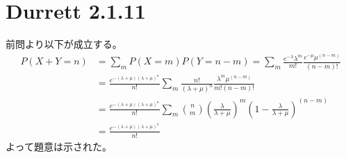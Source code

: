\documentclass{article}
\begin{document}
\section{Durrett 2.1.11}
前問より以下が成立する。
\begin{align*}
	P(X+Y = n) &= \sum_m P(X = m) P(Y = n-m) = \sum_m \frac{e^{-\lambda} \lambda^m}{m!} \frac{e^{-\mu} \mu^{(n-m)}}{(n-m)!}\\[8pt]
	&=\frac{e^{-(\lambda + \mu) (\lambda + \mu)^n}}{n!} \sum_m \frac{n!}{(\lambda + \mu)^n} \frac{\lambda^m \mu^{(n-m)}}{m! (n-m)!}\\[8pt]
	&= \frac{e^{-(\lambda + \mu) (\lambda + \mu)^n}}{n!} \sum_m \binom nm \left( \frac{\lambda}{\lambda + \mu} \right)^m \left( 1 - \frac{\lambda}{\lambda + \mu} \right)^{(n-m)}\\[8pt]
	&= \frac{e^{-(\lambda + \mu) (\lambda + \mu)^n}}{n!} 
\end{align*}
よって題意は示された。
\end{document}
